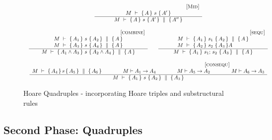 \begin{figure}[htb]
$
\begin{array}{c}
\inferruleSD{[\sc{Mid}]}
	{\hproves{M}  {A} {\ s\ }{A'} }
	{\hprovesN{M}  {A} {\ s\ }{A'} {A''} }
\\
\\
\begin{array}{lcl}
\inferruleSD{[\sc{combine}]}
	{  \begin{array}{l}
	\hprovesN{M}  {A_1} {\ s\ } {A_2}  {A} \\ %
	\hprovesN{M}  {A_3} {\ s\ } {A_4} {A}
	\end{array}
	}
	{ \hprovesN{M}  {A_1 \wedge A_3 }{\ s\ } {A_2 \wedge A_4} {A} }
& &
\inferruleSD{[\sc{sequ}]}
	{  \begin{array}{l} 
	\hprovesN{M}  {A_1} {\ s_1\ } {A_2}  {A}  \\ %
	\hproves{M}  {A_2} {\ s_2\ } {A_3} {A}
	\end{array}
	}
	{   \hprovesN{M}  {A_1   }{\ s_1; \, s_2\ } {  A_3} {A} }
\end{array}
\\ \\
\inferruleSD{ \hspace{3cm} [\sc{consequ}]}
	{
	 { \hprovesN  {M}  {A_4} {\, s\, } { A_5} {A_6}  }
	 \hspace{1.4cm} 
	 M \vdash A_1 \rightarrow A_4 
	 \hspace{1.4cm} 
	{ M \vdash A_5   \rightarrow  A_2  }
	 \hspace{1.4cm}   
	{  M \vdash A_6 \rightarrow A_3 }
	}
	{   \hprovesN{M}  {A_1 }{\ s\ } {A_2} {A_3} }
  \end{array}
 $
\caption{Hoare Quadruples - incorporating Hoare triples and substructural rules }
\label{f:substructural}
\end{figure}

\subsection{Second Phase: Quadruples}

